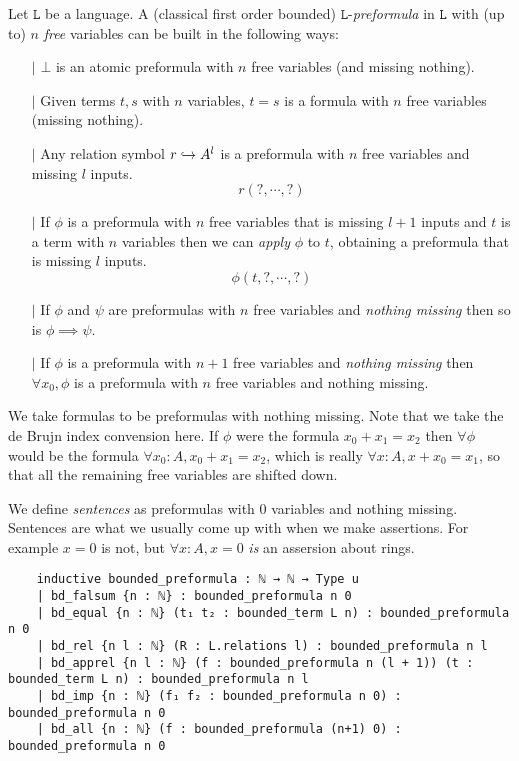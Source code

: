 \begin{dfn}[Formulas]
  Let $\texttt{L}$ be a language.
  A (classical first order bounded) $\texttt{L}$-\textit{preformula} in $\texttt{L}$
  with (up to) $n$ \textit{free} variables can be built in the following ways:
  \begin{itemize}
    \item[$\vert$] $\bot$ is an atomic preformula with $n$ free variables
          (and missing nothing).
    \item[$\vert$]
          Given terms $t, s$ with $n$ variables,
          $t = s$ is a formula with $n$ free variables (missing nothing).
    \item[$\vert$] Any relation symbol $r \hookrightarrow A^{l}$ is a preformula
          with $n$ free variables and missing $l$ inputs.
          \[ r (?, \cdots, ?)\]
    \item[$\vert$] If $\phi$ is a preformula with $n$ free variables that is missing
          $l + 1$ inputs and $t$ is a term with $n$ variables
          then we can \textit{apply} $\phi$ to $t$, obtaining
          a preformula that is missing $l$ inputs.
          \[ \phi(t , ? , \cdots, ? )\]
    \item[$\vert$] If $\phi$ and $\psi$ are preformulas with $n$ free variables
          and \textit{nothing missing} then so is $\phi \implies \psi$.
    \item[$\vert$] If $\phi$ is a preformula with $n + 1$ free variables
          and \textit{nothing missing} then $\forall x_{0}, \phi$ is a preformula
          with $n$ free variables and nothing missing.
  \end{itemize}

  We take formulas to be preformulas with nothing missing.
  Note that we take the de Brujn index convension here.
  If $\phi$ were the formula $x_{0} + x_{1} = x_{2}$ then $\forall \phi$ would be
  the formula $\forall x_{0} : A, x_{0} + x_{1} = x_{2}$,
  which is really $\forall x : A, x + x_{0} = x_{1}$,
  so that all the remaining free variables are shifted down.

  We define \textit{sentences} as preformulas with $0$ variables and nothing missing.
  Sentences are what we usually come up with when we make assertions.
  For example $x = 0$ is not, but $\forall x : A, x = 0$ \textit{is} an assersion about rings.

  \begin{lstlisting}
    inductive bounded_preformula : ℕ → ℕ → Type u
    | bd_falsum {n : ℕ} : bounded_preformula n 0
    | bd_equal {n : ℕ} (t₁ t₂ : bounded_term L n) : bounded_preformula n 0
    | bd_rel {n l : ℕ} (R : L.relations l) : bounded_preformula n l
    | bd_apprel {n l : ℕ} (f : bounded_preformula n (l + 1)) (t : bounded_term L n) : bounded_preformula n l
    | bd_imp {n : ℕ} (f₁ f₂ : bounded_preformula n 0) : bounded_preformula n 0
    | bd_all {n : ℕ} (f : bounded_preformula (n+1) 0) : bounded_preformula n 0


\end{lstlisting}
\end{dfn}
